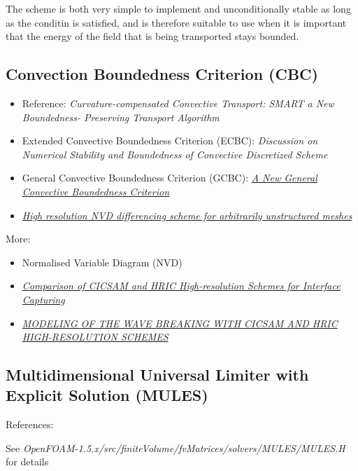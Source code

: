 The \UPWIND scheme is both very simple to implement and unconditionally stable as long as the \CFL conditin is satisfied, and is therefore suitable to use when it is important that the energy of the field that is being transported stays bounded. 

\subsection{Convection Boundedness Criterion (CBC)}

\sloppy
\begin{itemize}
    \item Reference: \textit{Curvature-compensated Convective Transport: SMART a New Boundedness- Preserving Transport Algorithm}
    \item Extended Convective Boundedness Criterion (ECBC): \textit{Discussion on Numerical Stability and Boundedness of Convective Discretized Scheme}
    \item General Convective Boundedness Criterion (GCBC): \textit{\href{http://gr.xjtu.edu.cn:8080/upload/PUB.1673.4/Wei_NHT.pdf}{A New General Convective Boundedness Criterion}}
    \item {} \textit{\href{http://powerlab.fsb.hr/ped/kturbo/openfoam/papers/GammaPaper.pdf}{High resolution NVD differencing scheme for arbitrarily unstructured meshes}}
\end{itemize}
\fussy

More:
\begin{itemize}
    \item Normalised Variable Diagram (NVD)
    \item \textit{\href{http://warminski.pollub.plwww.ptmts.org.pl/Waclaw-Koron-2-08.pdf}{Comparison of CICSAM and HRIC High-resolution Schemes for Interface Capturing}}
    \item \textit{\href{http://proceedings.fyper.com/eccomascfd2006/documents/85.pdf}{MODELING OF THE WAVE BREAKING WITH CICSAM AND HRIC HIGH-RESOLUTION SCHEMES}}
\end{itemize}

\subsection{Multidimensional Universal Limiter with Explicit Solution (MULES)}

References: \citep{Berberovi2009,Kissling2010}

See \textit{OpenFOAM-1.5.x/src/finiteVolume/fvMatrices/solvers/MULES/MULES.H} for details

